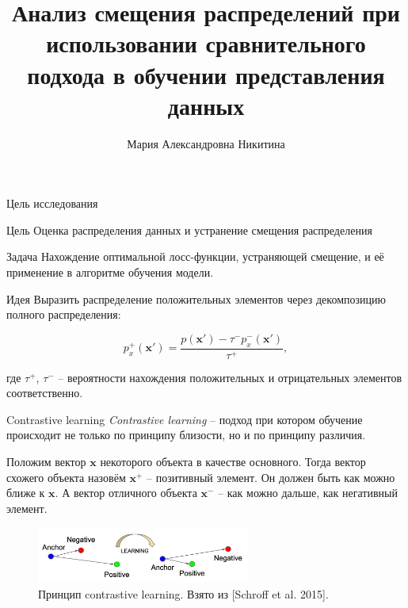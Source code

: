 \documentclass{beamer}
\title[\hbox to 56mm{Анализ смещения распределений}]{ Анализ смещения распределений при использовании сравнительного подхода в обучении представления данных}
\author[М.\,А. Никитина]{Мария Александровна Никитина}
\institute{Московский физико-технический институт}
\date{\footnotesize
\par\smallskip\emph{Кафедра:} Интеллектуальный анализ данных
\par\smallskip\emph{Научный руководитель:} кандидат ф.-м. наук Р.\,В.~Исаченко
\par\bigskip\small 2024}
\begin{document}
\begin{frame}
\thispagestyle{empty}
\maketitle
\end{frame}
\begin{frame}{Цель исследования}
\begin{block}{Цель}
Оценка распределения данных и устранение смещения распределения
\end{block}
\begin{block}{Задача}
Нахождение оптимальной лосс-функции, устраняющей смещение, и её применение в алгоритме обучения модели.
\end{block}
\begin{block}{Идея}
Выразить распределение положительных элементов через декомпозицию полного распределения:

\[p_x^+ (\textbf{x}') = \frac{p(\textbf{x}') - \tau^- p^-_x(\textbf{x}')}{\tau^+},\]

где $\tau^+$, $\tau^-$ -- вероятности нахождения положительных и отрицательных элементов соответственно.
\end{block}
\end{frame}
\begin{frame}{Contrastive learning}
\textit{Contrastive learning} – подход при котором обучение происходит не только по принципу близости, но и по принципу различия.

\bigskip

Положим вектор $\textbf{x}$ некоторого объекта в качестве основного. Тогда вектор схожего объекта назовём $\textbf{x}^+$ -- позитивный элемент. Он должен быть как можно ближе к $\textbf{x}$. А вектор отличного объекта $\textbf{x}^-$ -- как можно дальше, как негативный элемент.
\begin{figure}
\includegraphics[width=7cm]{Presentation/triplet-loss.png}
\caption{Принцип contrastive learning. Взято из [Schroff et al. 2015].}
\end{figure}
\end{frame}
\end{document}
